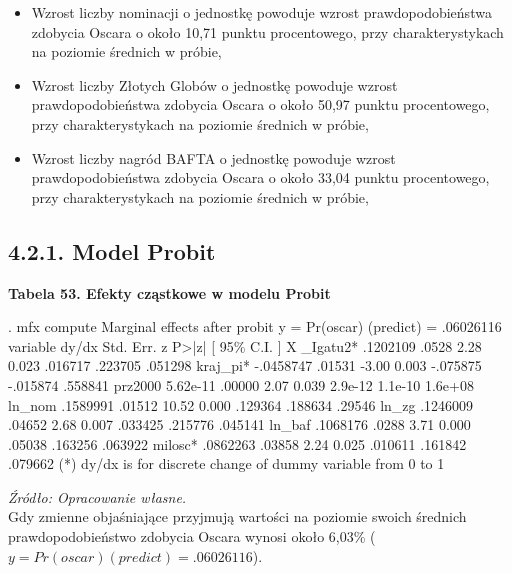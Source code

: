 \begin{itemize}
\item Wzrost liczby nominacji o jednostkę powoduje wzrost prawdopodobieństwa zdobycia Oscara o około 10,71 punktu procentowego, przy charakterystykach na poziomie średnich w próbie, 
\item Wzrost liczby Złotych Globów o jednostkę powoduje wzrost prawdopodobieństwa zdobycia Oscara o około 50,97 punktu procentowego, przy charakterystykach na poziomie średnich w próbie,
\item Wzrost liczby nagród BAFTA o jednostkę powoduje wzrost prawdopodobieństwa zdobycia Oscara o około 33,04 punktu procentowego, przy charakterystykach na poziomie średnich w próbie,
\end{itemize}

\subsection*{4.2.1. Model Probit}

\vspace{0.5cm}
\textbf{Tabela 53. Efekty cząstkowe w modelu Probit}
\begin{stlog}
. mfx compute
{\smallskip}
Marginal effects after probit
      y  = Pr(oscar) (predict)
         =  .06026116
variable {\VBAR}      dy/dx    Std. Err.     z    P>|z|  [    95\% C.I.   ]      X
_Igatu{\tytilde}2*{\VBAR}   .1202109       .0528    2.28   0.023   .016717  .223705   .051298
kraj_p{\tytilde}i*{\VBAR}  -.0458747      .01531   -3.00   0.003  -.075875 -.015874   .558841
prz{\tytilde}2000 {\VBAR}   5.62e-11      .00000    2.07   0.039   2.9e-12  1.1e-10   1.6e+08
  ln_nom {\VBAR}   .1589991      .01512   10.52   0.000   .129364  .188634    .29546
   ln_zg {\VBAR}   .1246009      .04652    2.68   0.007   .033425  .215776   .045141
  ln_baf {\VBAR}   .1068176       .0288    3.71   0.000    .05038  .163256   .063922
  milosc*{\VBAR}   .0862263      .03858    2.24   0.025   .010611  .161842   .079662
(*) dy/dx is for discrete change of dummy variable from 0 to 1
\end{stlog}
\textit{\footnotesize{Źródło: Opracowanie własne.}} \\

Gdy zmienne objaśniające przyjmują wartości na poziomie swoich średnich prawdopodobieństwo zdobycia Oscara wynosi około 6,03\% ($y = Pr(oscar)(predict) = .06026116$).


